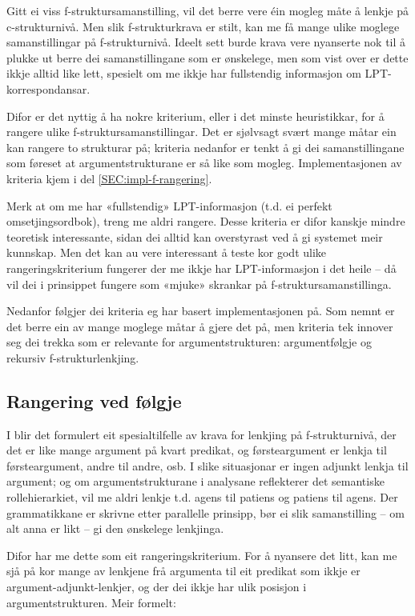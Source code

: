 \documentclass[12pt,a4paper,oneside,draft]{report}
\begin{document}
Gitt ei viss f-struktursamanstilling, vil det berre vere éin mogleg
måte å lenkje på c-strukturnivå. Men slik f-strukturkrava er stilt,
kan me få mange ulike moglege samanstillingar på
f-strukturnivå. Ideelt sett burde krava vere nyanserte nok til å
plukke ut berre dei samanstillingane som er ønskelege, men som vist
over er dette ikkje alltid like lett, spesielt om me ikkje har
fullstendig informasjon om LPT-korrespondansar.

Difor er det nyttig å ha nokre kriterium, eller i det minste
heuristikkar, for å rangere ulike f-struktursamanstillingar. Det er
sjølvsagt svært mange måtar ein kan rangere to strukturar på; kriteria
nedanfor er tenkt å gi dei samanstillingane som føreset at
argumentstrukturane er så like som mogleg. Implementasjonen av
kriteria kjem i del \ref{SEC:impl-f-rangering}.

Merk at om me har «fullstendig» LPT-informasjon (t.d. ei perfekt
omsetjingsordbok), treng me aldri rangere. Desse kriteria er difor
kanskje mindre teoretisk interessante, sidan dei alltid kan
overstyrast ved å gi systemet meir kunnskap. Men det kan au vere
interessant å teste kor godt ulike rangeringskriterium fungerer der me
ikkje har LPT-informasjon i det heile -- då vil dei i prinsippet
fungere som «mjuke» skrankar på f-struktursamanstillinga.

Nedanfor følgjer dei kriteria eg har basert implementasjonen på. Som
nemnt er det berre ein av mange moglege måtar å gjere det på, men
kriteria tek innover seg dei trekka som er relevante for
argumentstrukturen: argumentfølgje og rekursiv f-strukturlenkjing.

\subsection{Rangering ved følgje}
\label{sec-3.8.1}

I \citet[s.~75--76]{dyvik2009lmp} blir det formulert eit
spesialtilfelle av krava for lenkjing på f-strukturnivå, der det er
like mange argument på kvart predikat, og førsteargument er lenkja til
førsteargument, andre til andre, osb. I slike situasjonar er ingen
adjunkt lenkja til argument; og om argumentstrukturane i analysane
reflekterer det semantiske rollehierarkiet, vil me aldri lenkje
t.d. agens til patiens og patiens til agens. Der grammatikkane er
skrivne etter parallelle prinsipp, bør ei slik samanstilling -- om alt
anna er likt -- gi den ønskelege lenkjinga.

Difor har me dette som eit rangeringskriterium. For å nyansere det
litt, kan me sjå på kor mange av lenkjene frå argumenta til eit
predikat som ikkje er argument-adjunkt-lenkjer, og der dei ikkje har
ulik posisjon i argumentstrukturen. Meir formelt:
\end{document}
